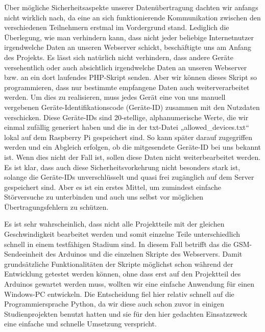 Über mögliche Sicherheitsaspekte unserer Datenübertragung dachten wir anfangs nicht wirklich nach, da eine an sich funktionierende Kommunikation zwischen den verschiedenen Teilnehmern erstmal im Vordergrund stand. Lediglich die Überlegung, wie man verhindern kann, dass nicht jeder beliebige Internetnutzer irgendwelche Daten an unseren Webserver schickt, beschäftigte uns am Anfang des Projekts. Es lässt sich natürlich nicht verhindern, dass andere Geräte versehentlich oder auch absichtlich irgendwelche Daten an unseren Webserver bzw. an ein dort laufendes PHP-Skript senden. Aber wir können dieses Skript so programmieren, dass nur bestimmte empfangene Daten auch weiterverarbeitet werden. Um dies zu realisieren, muss jedes Gerät eine von uns manuell vergebenen Geräte-Identifikationscode (Geräte-ID) zusammen mit den Nutzdaten verschicken. Diese Geräte-IDs sind 20-stellige, alphanumerische Werte, die wir einmal zufällig generiert haben und die in der txt-Datei „allowed\_devices.txt“ lokal auf dem Raspberry Pi gespeichert sind. So kann später darauf zugegriffen werden und ein Abgleich erfolgen, ob die mitgesendete Geräte-ID bei uns bekannt ist. Wenn dies nicht der Fall ist, sollen diese Daten nicht weiterbearbeitet werden.
Es ist klar, dass auch diese Sicherheitsvorkehrung nicht besonders stark ist, solange die Geräte-IDs unverschlüsselt und quasi frei zugänglich auf dem Server gespeichert sind. Aber es ist ein erstes Mittel, um zumindest einfache Störversuche zu unterbinden und auch uns selbst vor möglichen Übertragungsfehlern zu schützen.

Es ist sehr wahrscheinlich, dass nicht alle Projektteile mit der gleichen Geschwindigkeit bearbeitet werden und somit einzelne Teile unterschiedlich schnell in einem testfähigen Stadium sind. In diesem Fall betrifft das die GSM-Sendeeinheit des Arduinos und die einzelnen Skripte des Webservers. Damit grundsätzliche Funktionalitäten der Skripte möglichst schon während der Entwicklung getestet werden können, ohne dass erst auf den Projektteil des Arduinos gewartet werden muss, wollten wir eine einfache Anwendung für einen Windows-PC entwickeln. Die Entscheidung fiel hier relativ schnell auf die Programmiersprache Python, da wir diese auch schon zuvor in einigen Studienprojekten benutzt hatten und sie für den hier gedachten Einsatzzweck eine einfache und schnelle Umsetzung verspricht.

